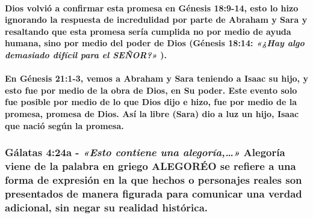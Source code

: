 \documentclass[11a pt,twoside]{article}
\newcommand{\scripture}[1]{%
  {\fontsize{12pt}{16pt}\selectfont\ScriptureFont\itshape #1}%
}
\let\oldsubsubsection\subsubsection
\renewcommand{\subsubsection}{\needspace{4\baselineskip}\oldsubsubsection}
\let\oldparagraph\paragraph
\renewcommand{\paragraph}{\needspace{3\baselineskip}\oldparagraph}
\begin{document}
\paragraph{\texorpdfstring{Dios volvió a confirmar esta promesa en
Génesis 18:9-14, esto lo hizo ignorando la respuesta de incredulidad por
parte de Abraham y Sara y resaltando que esta promesa sería cumplida no
por medio de ayuda humana, sino por medio del poder de Dios (Génesis
18:14:
\scripture{«¿Hay algo demasiado difícil para el SEÑOR?»}).}{Dios volvió a confirmar esta promesa en Génesis 18:9-14, esto lo hizo ignorando la respuesta de incredulidad por parte de Abraham y Sara y resaltando que esta promesa sería cumplida no por medio de ayuda humana, sino por medio del poder de Dios (Génesis 18:14: ).}}\label{dios-volviuxf3-a-confirmar-esta-promesa-en-guxe9nesis-189-14-esto-lo-hizo-ignorando-la-respuesta-de-incredulidad-por-parte-de-abraham-y-sara-y-resaltando-que-esta-promesa-seruxeda-cumplida-no-por-medio-de-ayuda-humana-sino-por-medio-del-poder-de-dios-guxe9nesis-1814-hay-algo-demasiado-difuxedcil-para-el-seuxf1or.}

\paragraph{En Génesis 21:1-3, vemos a Abraham y Sara teniendo a Isaac su
hijo, y esto fue por medio de la obra de Dios, en Su poder. Este evento
solo fue posible por medio de lo que Dios dijo e hizo, fue por medio de
la promesa, promesa de Dios. Así la libre (Sara) dio a luz un hijo,
Isaac que nació según la
promesa.}\label{en-guxe9nesis-211-3-vemos-a-abraham-y-sara-teniendo-a-isaac-su-hijo-y-esto-fue-por-medio-de-la-obra-de-dios-en-su-poder.-este-evento-solo-fue-posible-por-medio-de-lo-que-dios-dijo-e-hizo-fue-por-medio-de-la-promesa-promesa-de-dios.-asuxed-la-libre-sara-dio-a-luz-un-hijo-isaac-que-naciuxf3-seguxfan-la-promesa.}

\subsubsection{\texorpdfstring{Gálatas 4:24a -
\scripture{«Esto contiene una alegoría,…»} Alegoría viene de la palabra
en griego ALEGORÉO se refiere a una forma de expresión en la que hechos
o personajes reales son presentados de manera figurada para comunicar
una verdad adicional, sin negar su realidad
histórica.}{Gálatas 4:24a -  Alegoría viene de la palabra en griego ALEGORÉO se refiere a una forma de expresión en la que hechos o personajes reales son presentados de manera figurada para comunicar una verdad adicional, sin negar su realidad histórica.}}\label{guxe1latas-424a---esto-contiene-una-alegoruxeda-alegoruxeda-viene-de-la-palabra-en-griego-alegoruxe9o-se-refiere-a-una-forma-de-expresiuxf3n-en-la-que-hechos-o-personajes-reales-son-presentados-de-manera-figurada-para-comunicar-una-verdad-adicional-sin-negar-su-realidad-histuxf3rica.}
\end{document}

